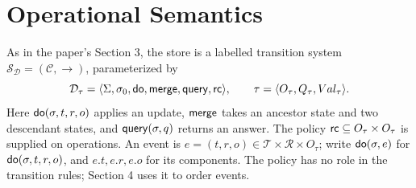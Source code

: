 \section{Operational Semantics}
\label{sec:execution}

As in the paper's Section 3, the store is a labelled transition system
$\mathcal S_{\mathcal D}=(\mathcal C,\longrightarrow)$, parameterized by
\[
 \mathcal D_\tau=\langle\Sigma,\sigma_0,\mathsf{do},\mathsf{merge},\mathsf{query},\mathsf{rc}\rangle,
 \qquad \tau=\langle O_\tau,Q_\tau,Val_\tau\rangle.
\]
Here $\mathsf{do}(\sigma,t,r,o)$ applies an update, $\mathsf{merge}$ takes an ancestor
state and two descendant states, and $\mathsf{query}(\sigma,q)$ returns an answer.
The policy $\mathsf{rc}\subseteq O_\tau\times O_\tau$ is supplied on operations.
An event is $e=(t,r,o)\in\mathcal T\times\mathcal R\times O_\tau$; write
$\mathsf{do}(\sigma,e)$ for $\mathsf{do}(\sigma,t,r,o)$, and $e.t,e.r,e.o$ for its
components. The policy has no role in the transition rules; Section 4 uses it
to order events.

